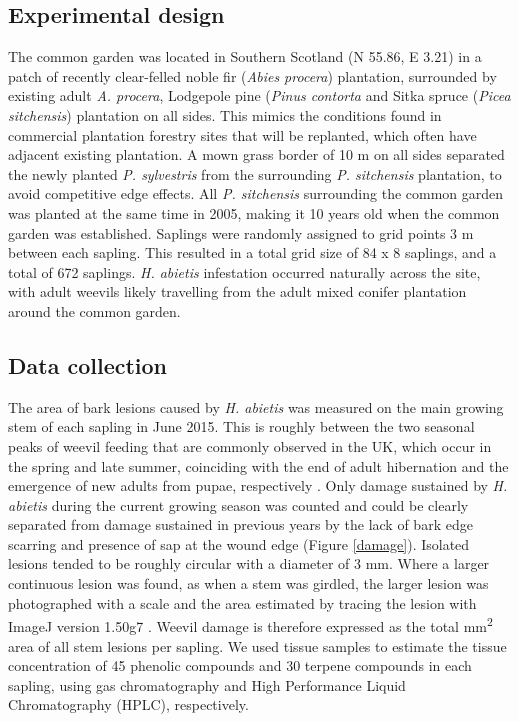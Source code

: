 \documentclass[a4paper, 11pt]{article}
\newcommand{\textapprox}{\raisebox{0.5ex}{\texttildelow}}
\newcommand{\todo}[1]{\textcolor{red}{#1}}   %
\begin{document}
\subsection*{Experimental design}

The common garden was located in Southern Scotland (N 55.86\textdegree{}, E \textminus{}3.21\textdegree{}) in a patch of recently clear-felled noble fir (\textit{Abies procera}) plantation, surrounded by existing adult \textit{A. procera}, Lodgepole pine (\textit{Pinus contorta} and Sitka spruce (\textit{Picea sitchensis}) plantation on all sides. This mimics the conditions found in commercial plantation forestry sites that will be replanted, which often have adjacent existing plantation. A mown grass border of 10 m on all sides separated the newly planted \textit{P. sylvestris} from the surrounding \textit{P. sitchensis} plantation, to avoid competitive edge effects. All \textit{P. sitchensis} surrounding the common garden was planted at the same time in 2005, making it 10 years old when the common garden was established. %
Saplings were randomly assigned to grid points 3 m between each sapling. This resulted in a total grid size of 84 x 8 saplings, and a total of 672 saplings. \textit{H. abietis} infestation occurred naturally across the site, with adult weevils likely travelling from the adult mixed conifer plantation around the common garden. 

\subsection*{Data collection}

The area of bark lesions caused by \textit{H. abietis} was measured on the main growing stem of each sapling in June 2015. This is roughly between the two seasonal peaks of weevil feeding that are commonly observed in the UK, which occur in the spring and late summer, coinciding with the end of adult hibernation and the emergence of new adults from pupae, respectively \citep{Nordenhem1989, Leather1999}. Only damage sustained by \textit{H. abietis} during the current growing season was counted and could be clearly separated from damage sustained in previous years by the lack of bark edge scarring and presence of sap at the wound edge (Figure \ref{damage}). Isolated lesions tended to be roughly circular with a diameter of \textapprox{}3 mm. Where a larger continuous lesion was found, as when a stem was girdled, the larger lesion was photographed with a scale and the area estimated by tracing the lesion with ImageJ version 1.50g7 \citep{Schneider2012}. Weevil damage is therefore expressed as the total mm\textsuperscript{2} area of all stem lesions per sapling.  We used tissue samples to estimate the tissue concentration of 45 phenolic compounds and 30 terpene compounds in each sapling, using gas chromatography and High Performance Liquid Chromatography (HPLC), respectively. 
\end{document}
